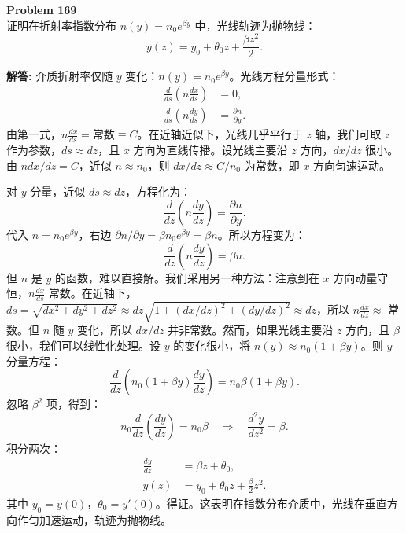 \documentclass[12pt, a4paper, oneside]{ctexart}
\newenvironment{solution}{\par\noindent\textbf{解答:}\quad}{\par}
\begin{document}
\begin{mdframed}[backgroundcolor=gray!10, linewidth=0pt]
    \textbf{Problem 169} \\
    证明在折射率指数分布 $n(y) = n_0 e^{\beta y}$ 中，光线轨迹为抛物线：
    \[
    y(z) = y_0 + \theta_0 z + \frac{\beta z^2}{2}.
    \]
\end{mdframed}
\begin{solution}
    介质折射率仅随 $y$ 变化：$n(y) = n_0 e^{\beta y}$。光线方程分量形式：
    \begin{align*}
        \frac{d}{ds} \left( n \frac{dx}{ds} \right) &= 0, \\
        \frac{d}{ds} \left( n \frac{dy}{ds} \right) &= \frac{\partial n}{\partial y}.
    \end{align*}
    由第一式，$n \frac{dx}{ds} = \text{常数} \equiv C$。在近轴近似下，光线几乎平行于 $z$ 轴，我们可取 $z$ 作为参数，$ds \approx dz$，且 $x$ 方向为直线传播。设光线主要沿 $z$ 方向，$dx/dz$ 很小。由 $n dx/dz = C$，近似 $n \approx n_0$，则 $dx/dz \approx C/n_0$ 为常数，即 $x$ 方向匀速运动。

    对 $y$ 分量，近似 $ds \approx dz$，方程化为：
    \[
    \frac{d}{dz} \left( n \frac{dy}{dz} \right) = \frac{\partial n}{\partial y}.
    \]
    代入 $n = n_0 e^{\beta y}$，右边 $\partial n/\partial y = \beta n_0 e^{\beta y} = \beta n$。所以方程变为：
    \[
    \frac{d}{dz} \left( n \frac{dy}{dz} \right) = \beta n.
    \]
    但 $n$ 是 $y$ 的函数，难以直接解。我们采用另一种方法：注意到在 $x$ 方向动量守恒，$n \frac{dx}{ds}$ 常数。在近轴下，$ds = \sqrt{dx^2+dy^2+dz^2} \approx dz \sqrt{1+(dx/dz)^2+(dy/dz)^2} \approx dz$，所以 $n \frac{dx}{dz} \approx$ 常数。但 $n$ 随 $y$ 变化，所以 $dx/dz$ 并非常数。然而，如果光线主要沿 $z$ 方向，且 $\beta$ 很小，我们可以线性化处理。设 $y$ 的变化很小，将 $n(y) \approx n_0 (1 + \beta y)$。则 $y$ 分量方程：
    \[
    \frac{d}{dz} \left( n_0 (1+\beta y) \frac{dy}{dz} \right) = n_0 \beta (1+\beta y).
    \]
    忽略 $\beta^2$ 项，得到：
    \[
    n_0 \frac{d}{dz} \left( \frac{dy}{dz} \right) = n_0 \beta \quad \Rightarrow \quad \frac{d^2 y}{dz^2} = \beta.
    \]
    积分两次：
    \begin{align*}
        \frac{dy}{dz} &= \beta z + \theta_0, \\
        y(z) &= y_0 + \theta_0 z + \frac{\beta}{2} z^2.
    \end{align*}
    其中 $y_0 = y(0)$，$\theta_0 = y'(0)$。得证。这表明在指数分布介质中，光线在垂直方向作匀加速运动，轨迹为抛物线。
\end{solution}
\end{document}
